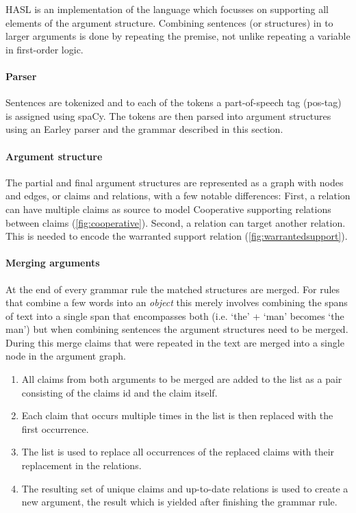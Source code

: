HASL is an implementation of the language which focusses on supporting all elements of the argument structure. Combining sentences (or structures) in to larger arguments is done by repeating the premise, not unlike repeating a variable in first-order logic.

\paragraph{Parser} Sentences are tokenized and to each of the tokens a part-of-speech tag (pos-tag) is assigned using spaCy\cite{spacy2}. The tokens are then parsed into argument structures using an Earley parser and the grammar described in this section.

\paragraph{Argument structure} The partial and final argument structures are represented as a graph with nodes and edges, or claims and relations, with a few notable differences: First, a relation can have multiple claims as source to model Cooperative supporting relations between claims (\autoref{fig:cooperative}). Second, a relation can target another relation. This is needed to encode the warranted support relation (\autoref{fig:warrantedsupport}).

\paragraph{Merging arguments} At the end of every grammar rule the matched structures are merged. For rules that combine a few words into an \emph{object} this merely involves combining the spans of text into a single span that encompasses both (i.e. `the' + `man' becomes `the man') but when combining sentences the argument structures need to be merged. During this merge claims that were repeated in the text are merged into a single node in the argument graph.

\begin{enumerate}
    \item All claims from both arguments to be merged are added to the list as a pair consisting of the claims id and the claim itself.
    \item Each claim that occurs multiple times in the list is then replaced with the first occurrence.
    \item The list is used to replace all occurrences of the replaced claims with their replacement in the relations.
    \item The resulting set of unique claims and up-to-date relations is used to create a new argument, the result which is yielded after finishing the grammar rule.
\end{enumerate}

